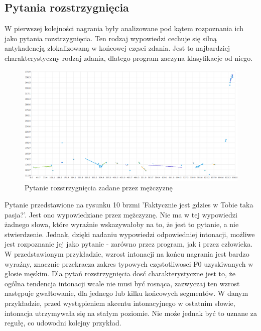 \documentclass[a4paper,12 pt]{article}
\begin{document}
\subsection{Pytania rozstrzygnięcia}
W pierwszej kolejności nagrania były analizowane pod kątem rozpoznania ich jako pytania rozstrzygnięcia. Ten rodzaj wypowiedzi cechuje się silną antykadencją zlokalizowaną w końcowej częsci zdania.
Jest to najbardziej charakterystyczny rodzaj zdania, dlatego program zaczyna klasyfikacje od niego.
 \FloatBarrier
\begin{figure}[h]
\centering
\includegraphics[scale=0.6]{pytanie_rozstrzygniecia.png}
\caption{Pytanie rozstrzygnięcia zadane przez mężczyznę}
\end{figure}
\FloatBarrier
Pytanie przedstawione na rysunku 10 brzmi 'Faktycznie jest gdzies w Tobie taka pasja?'. Jest ono wypowiedziane przez mężczyznę. Nie ma w tej wypowiedzi żadnego słowa, które wyraźnie wskazywałoby na to, że jest to pytanie, a nie stwierdzenie. Jednak, dzięki nadaniu wypowiedzi odpowiedniej intonacji, możliwe jest rozpoznanie jej jako pytanie - zarówno przez program, jak i przez człowieka. W przedstawionym przykładzie, wzrost intonacji na końcu nagrania jest bardzo wyraźny, znacznie przekracza zakres typowych częstotliwosci F0 uzyskiwanych w głosie męskim. Dla pytań rozstrzygnięcia dosć charakterystyczne jest to, że ogólna tendencja intonacji wcale nie musi być rosnąca, zazwyczaj ten wzrost następuje gwałtowanie, dla jednego lub kilku końcowych segmentów. W danym przykładzie, przed wystąpieniem akcentu intonacyjnego w ostatnim słowie, intonacja utrzymywała się na stałym poziomie. Nie może jednak być to uznane za regułę, co udowodni kolejny przykład.
 \FloatBarrier
\end{document}
